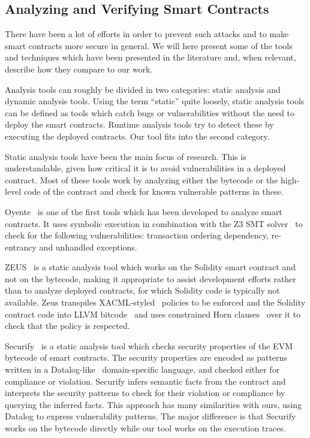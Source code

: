 \subsection{Analyzing and Verifying Smart Contracts}
\label{ssec:related-analysis-tools}
There have been a lot of efforts in order to prevent such attacks and to make smart contracts more secure in general. We will here present some of the tools and techniques which have been presented in the literature and, when relevant, describe how they compare to our work.

Analysis tools can roughly be divided in two categories: static analysis and dynamic analysis tools.
Using the term ``static'' quite loosely, static analysis tools can be defined as tools which catch bugs or vulnerabilities without the need to deploy the smart contracts.
Runtime analysis tools try to detect these by executing the deployed contracts.
Our tool fits into the second category.

 Static analysis tools have been the main focus of research.
This is understandable, given how critical it is to avoid vulnerabilities in a deployed contract.
Most of these tools work by analyzing either the bytecode or the high-level code of the contract and check for known vulnerable patterns in these.

Oyente~\cite{Luu2016a} is one of the first tools which has been developed to analyze smart contracts.
It uses symbolic execution in combination with the Z3 SMT solver~\cite{de2008z3} to check for the following vulnerabilities: transaction ordering dependency, re-entrancy and unhandled exceptions.

ZEUS~\cite{DBLP:conf/ndss/KalraGDS18} is a static analysis tool which works on the Solidity smart contract and not on the bytecode, making it appropriate to assist development efforts rather than to analyze deployed contracts, for which Solidity code is typically not available.
Zeus transpiles XACML-styled~\cite{XACML} policies to be enforced and the Solidity contract code into LLVM bitcode~\cite{lattner2004llvm} and uses constrained Horn clauses~\cite{bjorner2012program,mcmillan2007interpolants} over it to check that the policy is respected.

Securify~\cite{Tsankov2018} is a static analysis tool which checks security properties of the EVM bytecode of smart contracts.
The security properties are encoded as patterns written in a Datalog-like~\cite{ullman1984principles} domain-specific language, and checked either for compliance or violation.
Securify infers semantic facts from the contract and interprets the security patterns to check for their violation or compliance by querying the inferred facts.
This approach has many similarities with ours, using Datalog to express vulnerability patterns.
The major difference is that Securify works on the bytecode directly while our tool works on the execution traces.

